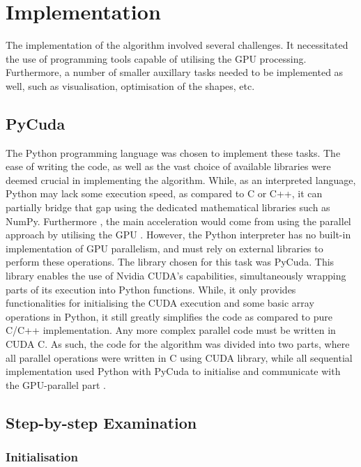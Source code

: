 \documentclass[12pt, oneside]{report}
\begin{document}
\section {Implementation}

The implementation of the algorithm involved several challenges. It necessitated the use of programming tools capable of utilising the GPU processing. Furthermore, a number of smaller auxillary tasks needed to be implemented as well, such as visualisation, optimisation of the shapes, etc.

\subsection{PyCuda}

The Python programming language was chosen to implement these tasks. The ease of writing the code, as well as the vast choice of available libraries were deemed crucial in implementing the algorithm. While, as an interpreted language, Python may lack some execution speed, as compared to C or C++, it can partially bridge that gap using the dedicated mathematical libraries such as NumPy. Furthermore , the main acceleration would come from using the parallel approach by utilising the GPU \cite{numpy}. \newline
However, the Python interpreter has no built-in implementation of GPU parallelism, and must rely on external libraries to perform these operations. The library chosen for this task was PyCuda. This library enables the use of Nvidia CUDA's capabilities, simultaneously wrapping parts of its execution into Python functions. While, it only provides functionalities for initialising the CUDA execution and some basic array operations in Python, it still greatly simplifies the code as compared to pure C/C++ implementation. Any more complex parallel code must be written in CUDA C. As such, the code for the algorithm was divided into two parts, where all parallel operations were written in C using CUDA library, while all sequential implementation used Python with PyCuda to initialise and communicate with the GPU-parallel part \cite{pycuda}.


\subsection{Step-by-step Examination}

\subsubsection{Initialisation}
\end{document}
